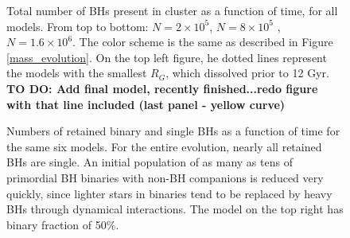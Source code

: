 \documentclass[12pt,preprint]{aastex}
\begin{document}

\begin{figure} [!h]

	\caption{Total number of BHs present in cluster as a function of time, for all models.
	 From top to bottom: $N=2 \times 10^5$, $N=8 \times 10^5$ , $N=1.6 \times 10^6$. 
	 The color scheme is the same as described in Figure \ref{mass_evolution}. On the top left figure, 
	 he dotted lines represent the models with the smallest $R_G$, which dissolved 
	 prior to 12 Gyr. \bf{TO DO: Add final model, recently finished...redo figure with that line included (last panel - yellow curve)}}

	\label{fig:bhs_vs_time}
\end{figure}




	\begin{figure}[!h]

	\caption{Numbers of retained binary and single BHs as a function of time for the same six models.
	For the entire evolution, nearly all retained BHs are single. An initial population of as many 
	as tens of primordial BH binaries with non-BH companions is reduced very quickly, since lighter
	stars in binaries tend to be replaced by heavy BHs through dynamical interactions. The model on
	the top right has binary fraction of 50\%.
	}
	
	\label{fig:RetBHsSingleBinary}
\end{figure}




\end{document}

